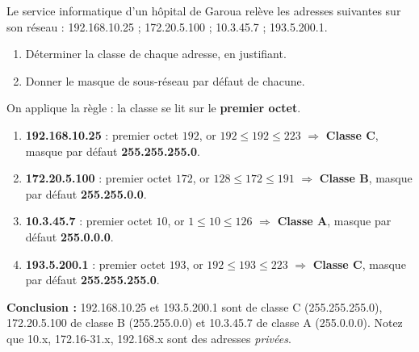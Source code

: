 \documentclass[11pt]{article}
\begin{document}
\begin{exoresolu}
Le service informatique d'un hôpital de Garoua relève les adresses suivantes sur son réseau : 192.168.10.25 ; 172.20.5.100 ; 10.3.45.7 ; 193.5.200.1.
\begin{enumerate}
\item Déterminer la classe de chaque adresse, en justifiant.
\item Donner le masque de sous-réseau par défaut de chacune.
\end{enumerate}
\tcblower
On applique la règle : la classe se lit sur le \textbf{premier octet}.
\begin{enumerate}
\item \textbf{192.168.10.25} : premier octet $192$, or $192 \le 192 \le 223$ $\Rightarrow$ \textbf{Classe C}, masque par défaut \textbf{255.255.255.0}.
\item \textbf{172.20.5.100} : premier octet $172$, or $128 \le 172 \le 191$ $\Rightarrow$ \textbf{Classe B}, masque par défaut \textbf{255.255.0.0}.
\item \textbf{10.3.45.7} : premier octet $10$, or $1 \le 10 \le 126$ $\Rightarrow$ \textbf{Classe A}, masque par défaut \textbf{255.0.0.0}.
\item \textbf{193.5.200.1} : premier octet $193$, or $192 \le 193 \le 223$ $\Rightarrow$ \textbf{Classe C}, masque par défaut \textbf{255.255.255.0}.
\end{enumerate}
\textbf{Conclusion :} 192.168.10.25 et 193.5.200.1 sont de classe C (255.255.255.0), 172.20.5.100 de classe B (255.255.0.0) et 10.3.45.7 de classe A (255.0.0.0). Notez que 10.x, 172.16-31.x, 192.168.x sont des adresses \emph{privées}.
\end{exoresolu}
\end{document}
